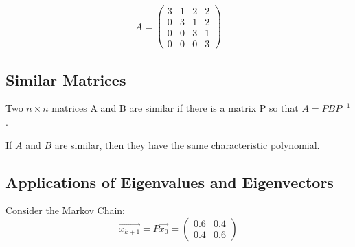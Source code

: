 \begin{equation}
    A = \begin{pmatrix}
        3 & 1 & 2 & 2 \\ 0 & 3 & 1 & 2 \\ 0 & 0 & 3 & 1 \\ 0 & 0 & 0 & 3
    \end{pmatrix}
\end{equation}

\subsection{Similar Matrices}
\begin{definition}
    Two \(n \times n\) matrices A and B are similar if there is a matrix P so that \(A = PBP^{-1}\).
\end{definition}

\begin{theorem}
    If \(A\) and \(B\) are similar, then they have the same characteristic polynomial.
\end{theorem}

\subsection{Applications of Eigenvalues and Eigenvectors}
\noindent
Consider the Markov Chain:
\begin{equation}
    \Vec{x_{k+1}} = P \Vec{x_0} = \begin{pmatrix}
        0.6 & 0.4 \\ 0.4 & 0.6
    \end{pmatrix}
\end{equation}
